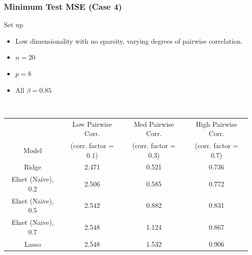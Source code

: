 \begin{frame}[fragile]
\frametitle{Minimum Test MSE (Case 4)}

\begin{block}{Set up}
    \begin{itemize}
        \item Low dimensionality with no sparsity, varying degrees of pairwise correlation.
        \item $n = 20$
        \item $p = 8$
        \item All $\beta = 0.85$
    \end{itemize}
\end{block} \\

\begin{center}
    
    \begin{tabular}{||c c c c||} 
         \hline
          & Low Pairwise Corr. & Med Pairwise Corr. & High Pairwise Corr. \\ [0.5ex] 
          Model & (corr. factor = 0.1) & (corr. factor = 0.3) & (corr. factor = 0.7)\\ [0.5ex]
         \hline\hline
         Ridge & \cellcolor{pink!60}2.471 & \cellcolor{pink!60}0.521 & \cellcolor{pink!60}0.736\\ 
         \hline
         Elnet (Naive), 0.2 & 2.506 & 0.585 & 0.772\\
         \hline
         Elnet (Naive), 0.5 & 2.542 & 0.882 & 0.831\\
        \hline
         Elnet (Naive), 0.7 & 2.548 & 1.124 & 0.867\\
        \hline
         Lasso & 2.548 & 1.532 & 0.906\\
        \hline
    \end{tabular}

\end{center}
\end{frame}
